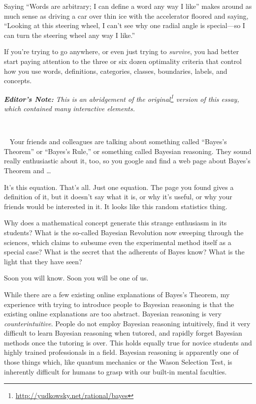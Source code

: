 {
 Saying ``Words are arbitrary; I can define a word
any way I like'' makes around as much sense as
driving a car over thin ice with the accelerator floored and saying,
``Looking at this steering wheel, I
can't see why one radial angle is special---so I can
turn the steering wheel any way I like.''}

{
 If you're trying to go anywhere, or even just
trying to \textit{survive}, you had better start paying attention to
the three or six dozen optimality criteria that control how you use
words, definitions, categories, classes, boundaries, labels, and
concepts.}

\myendsectiontext

\label{intuitive_bayesian}

{
\textbf{\textit{Editor's
Note:}}\textit{ This is an abridgement of the
 original\footnote{\url{http://yudkowsky.net/rational/bayes}} version of this essay, which contained many
interactive elements.}}

{
\textit{ ~}}

{
\textit{\ } Your friends and colleagues are talking about something
called ``Bayes's
Theorem'' or
``Bayes's Rule,'' or
something called Bayesian reasoning. They sound really enthusiastic
about it, too, so you google and find a web page about
Bayes's Theorem and \ldots}

{
 It's this equation. That's all.
Just one equation. The page you found gives a definition of it, but it
doesn't say what it is, or why it's
useful, or why your friends would be interested in it. It looks like
this random statistics thing.}

{
 Why does a mathematical concept generate this strange enthusiasm
in its students? What is the so-called Bayesian Revolution now sweeping
through the sciences, which claims to subsume even the experimental
method itself as a special case? What is the secret that the adherents
of Bayes know? What is the light that they have seen?}

{
 Soon you will know. Soon you will be one of us.}

{
 While there are a few existing online explanations of
Bayes's Theorem, my experience with trying to introduce
people to Bayesian reasoning is that the existing online explanations
are too abstract. Bayesian reasoning is very \textit{counterintuitive}.
People do not employ Bayesian reasoning intuitively, find it very
difficult to learn Bayesian reasoning when tutored, and rapidly forget
Bayesian methods once the tutoring is over. This holds equally true for
novice students and highly trained professionals in a field. Bayesian
reasoning is apparently one of those things which, like quantum
mechanics or the Wason Selection Test, is inherently difficult for
humans to grasp with our built-in mental faculties.}

